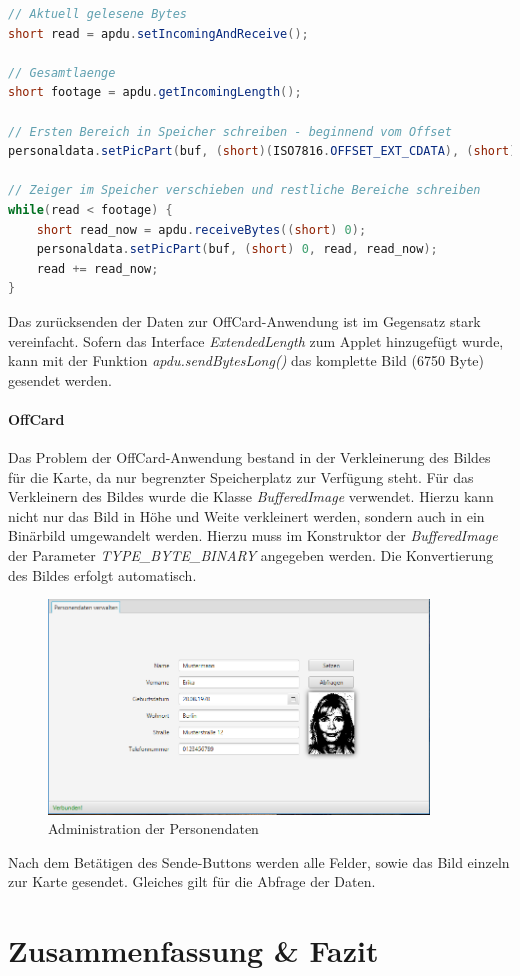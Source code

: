 \documentclass[	a4paper,
			11pt,
			oneside,
			parskip]{scrartcl}
\begin{document}
\begin{center}
\begin{minipage}{0.9\textwidth} 
\begin{lstlisting}[language=Java]
// Aktuell gelesene Bytes
short read = apdu.setIncomingAndReceive();

// Gesamtlaenge
short footage = apdu.getIncomingLength();
	
// Ersten Bereich in Speicher schreiben - beginnend vom Offset		
personaldata.setPicPart(buf, (short)(ISO7816.OFFSET_EXT_CDATA), (short) 0, read);

// Zeiger im Speicher verschieben und restliche Bereiche schreiben		
while(read < footage) {
	short read_now = apdu.receiveBytes((short) 0);
	personaldata.setPicPart(buf, (short) 0, read, read_now);
	read += read_now;
}\end{lstlisting}
\end{minipage}
\end{center}

Das zurücksenden der Daten zur OffCard-Anwendung ist im Gegensatz stark vereinfacht. Sofern das Interface \textit{ExtendedLength} zum Applet hinzugefügt wurde, kann mit der Funktion \textit{apdu.sendBytesLong()} das komplette Bild (6750 Byte) gesendet werden.

\paragraph{OffCard} Das Problem der OffCard-Anwendung bestand in der Verkleinerung des Bildes für die Karte, da nur begrenzter Speicherplatz zur Verfügung steht. Für das Verkleinern des Bildes wurde die Klasse \textit{BufferedImage} verwendet. Hierzu kann nicht nur das Bild in Höhe und Weite verkleinert werden, sondern auch in ein Binärbild umgewandelt werden. Hierzu muss im Konstruktor der \textit{BufferedImage} der Parameter \textit{TYPE\_BYTE\_BINARY} angegeben werden. Die Konvertierung des Bildes erfolgt automatisch.

\begin{figure}[H]
	\centering
  	\includegraphics[width=0.9\textwidth]{img/pers}
	\caption{Administration der Personendaten}
	\label{pers}
\end{figure}

Nach dem Betätigen des Sende-Buttons werden alle Felder, sowie das Bild einzeln zur Karte gesendet. Gleiches gilt für die Abfrage der Daten.	
	

\section{Zusammenfassung \& Fazit}
\end{document}
